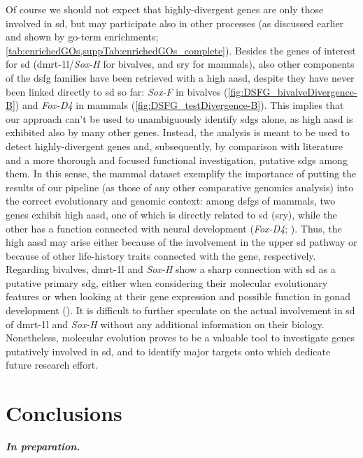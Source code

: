 Of course we should not expect that highly-divergent genes are only those involved in \gls{sd}, but may participate also in other processes (as discussed earlier and shown by \gls{go}-term enrichments; \cref{tab:enrichedGOs,suppTab:enrichedGOs_complete}). Besides the genes of interest for \gls{sd} (\gls{dmrt-1l}/\textit{Sox-H} for bivalves, and \gls{sry} for mammals), also other components of the \gls{dsfg} families have been retrieved with a high \gls{aasd}, despite they have never been linked directly to \gls{sd} so far: \textit{Sox-F} in bivalves (\cref{fig:DSFG_bivalveDivergence-B}) and \textit{Fox-D4} in mammals (\cref{fig:DSFG_testDivergence-B}). This implies that our approach can't be used to unambiguously identify \glspl{sdg} alone, as high \gls{aasd} is exhibited also by many other genes. Instead, the analysis is meant to be used to detect highly-divergent genes and, subsequently, by comparison with literature and a more thorough and focused functional investigation, putative \glspl{sdg} among them. In this sense, the mammal dataset exemplify the importance of putting the results of our pipeline (as those of any other comparative genomics analysis) into the correct evolutionary and genomic context: among \glspl{dsfg} of mammals, two genes exhibit high \gls{aasd}, one of which is directly related to \gls{sd} (\gls{sry}), while the other has a function connected with neural development (\textit{Fox-D4}; ). Thus, the high \gls{aasd} may arise either because of the involvement in the upper \gls{sd} pathway or because of other life-history traits connected with the gene, respectively. Regarding bivalves, \gls{dmrt-1l} and \textit{Sox-H} show a sharp connection with \gls{sd} as a putative primary \gls{sdg}, either when considering their molecular evolutionary features or when looking at their gene expression and possible function in gonad development (). It is difficult to further speculate on the actual involvement in \gls{sd} of \gls{dmrt-1l} and \textit{Sox-H} without any additional information on their biology. Nonetheless, molecular evolution proves to be a valuable tool to investigate genes putatively involved in \gls{sd}, and to identify major targets onto which dedicate future research effort.

\section{Conclusions} \label{chapter:molecularEvolution-conclusions}

\textbf{\textit{In preparation.}}

% 